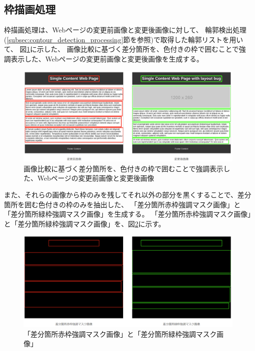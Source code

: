 \subsection{枠描画処理}\label{subsec:Bounding box drawing process}
枠描画処理は、Webページの変更前画像と変更後画像に対して、
輪郭検出処理(\ref{subsec:contour_detection_processing}節を参照)で取得した輪郭リストを用いて、
図\ref{fig: img_diff_highlight}に示した、
画像比較に基づく差分箇所を、色付きの枠で囲むことで強調表示した、Webページの変更前画像と変更後画像を生成する。
\begin{figure}[tp]
    \begin{center}
        \includegraphics[width=1.0\columnwidth]{image/4_img_diff_highlight.png}
        \caption{画像比較に基づく差分箇所を、色付きの枠で囲むことで強調表示した、Webページの変更前画像と変更後画像}
        \label{fig: img_diff_highlight}
    \end{center}
\end{figure}
また、それらの画像から枠のみを残してそれ以外の部分を黒くすることで、差分箇所を囲む色付きの枠のみを抽出した、
「差分箇所赤枠強調マスク画像」と「差分箇所緑枠強調マスク画像」を生成する。
「差分箇所赤枠強調マスク画像」と「差分箇所緑枠強調マスク画像」を、図\ref{fig: img_diff_highlight_mask}に示す。
\begin{figure}[tp]
    \begin{center}
        \includegraphics[width=1.0\columnwidth]{image/4_img_diff_highlight_mask.png}
        \caption{「差分箇所赤枠強調マスク画像」と「差分箇所緑枠強調マスク画像」}
        \label{fig: img_diff_highlight_mask}
    \end{center}
\end{figure}
